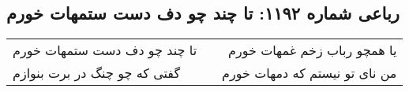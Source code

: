 \begin{center}
\section*{رباعی شماره ۱۱۹۲: تا چند چو دف دست ستمهات خورم}
\label{sec:1192}
\begin{longtable}{l p{0.5cm} r}
تا چند چو دف دست ستمهات خورم
&&
یا همچو رباب زخم غمهات خورم
\\
گفتی که چو چنگ در برت بنوازم
&&
من نای تو نیستم که دمهات خورم
\\
\end{longtable}
\end{center}
